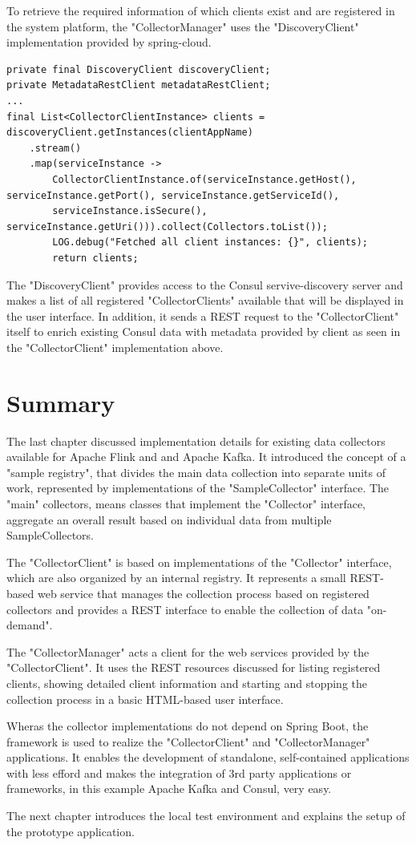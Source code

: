 To retrieve the required information of which clients exist and are registered in the system platform, the "CollectorManager"
uses the "DiscoveryClient" implementation provided by spring-cloud.

\begin{lstlisting}[caption={"CollectorClientInstanceService", Get client instances}, captionpos=b, label={lst:client-instance-service}]
private final DiscoveryClient discoveryClient;
private MetadataRestClient metadataRestClient;
...
final List<CollectorClientInstance> clients = discoveryClient.getInstances(clientAppName)
    .stream()
    .map(serviceInstance ->
        CollectorClientInstance.of(serviceInstance.getHost(), serviceInstance.getPort(), serviceInstance.getServiceId(),
        serviceInstance.isSecure(), serviceInstance.getUri())).collect(Collectors.toList());
        LOG.debug("Fetched all client instances: {}", clients);
        return clients;
\end{lstlisting}

The "DiscoveryClient" provides access to the Consul servive-discovery server and makes a list of all registered "CollectorClients"
available that will be displayed in the user interface. In addition, it sends a REST request to the "CollectorClient" itself to enrich
existing Consul data with metadata provided by client as seen in the "CollectorClient" implementation above.

\section{Summary}

The last chapter discussed implementation details for existing data collectors available for Apache Flink and and Apache Kafka.
It introduced the concept of a "sample registry", that divides the main data collection into separate units of work, represented
by implementations of the "SampleCollector" interface. The "main" collectors, means classes that implement the "Collector"
interface, aggregate an overall result based on individual data from multiple SampleCollectors.

The "CollectorClient" is based on implementations of the "Collector" interface, which are also organized by an internal registry.
It represents a small REST-based web service that manages the collection process based on registered collectors and provides a REST
interface to enable the collection of data "on-demand".

The "CollectorManager" acts a client for the web services provided by the "CollectorClient". It uses the REST resources discussed
for listing registered clients, showing detailed client information and starting and stopping the collection process in a basic
HTML-based user interface.

Wheras the collector implementations do not depend on Spring Boot, the framework is used to realize the "CollectorClient" and
"CollectorManager" applications. It enables the development of standalone, self-contained applications with less efford and makes
the integration of 3rd party applications or frameworks, in this example Apache Kafka and Consul, very easy.

The next chapter introduces the local test environment and explains the setup of the prototype application.